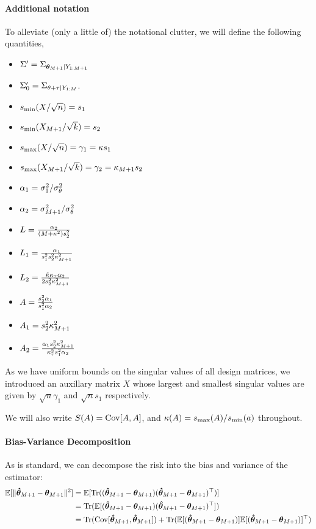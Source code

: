 \paragraph{Additional notation} To alleviate (only a little of) the notational clutter, we will define the following quantities,
\begin{itemize}
\item ${\Sigma'} = \Sigma_{\bm{\theta}_{M+1} \vert Y_{1:M+1}}$
\item ${\Sigma'_{0}} = \Sigma_{\theta + \tau \vert Y_{1:M}}$.
\item ${s_{\min}}(X_{} / \sqrt{{n}}) = s_1$
\item ${s_{\min}}(X_{M+1} / \sqrt{{k}}) = s_2$
\item ${s_{\max}}(X_{} / \sqrt{{n}}) = \gamma_1 = \kappa s_1$
\item ${s_{\max}}(X_{M+1} / \sqrt{{k}}) = \gamma_2 = \kappa_{M+1} s_2$
\item $\alpha_1 = {\sigma_1^2} / {\sigma_\theta^2}$
\item $\alpha_2 = {\sigma_{M+1}^2} / {\sigma_\theta^2}$
\item $L = \frac{\alpha_2}{(M + \kappa^2)s_2^2}$
\item $L_1 = \frac{\alpha_1}{s_1^2s_2^2 \kappa_{M+1}^2}$
\item $L_2 = \frac{\tilde{\kappa} \kappa_\tau \alpha_2}{2s_2^2 \kappa_{M+1}^2}$
\item $A = \frac{s_2^2 \alpha_1}{s_1^2 \alpha_2}$
\item $A_1 = s_2^2 \kappa_{M+1}^2$
\item $A_2 = \frac{\alpha_1 s_2^2 \kappa_{M+1}^2}{\kappa_\tau^2 s_1^2 \alpha_2}$
\end{itemize}

As we have uniform bounds on the singular values of all design matrices, we introduced an auxillary matrix $X$ whose largest and smallest singular values are given by $\sqrt{n}\gamma_1$ and $\sqrt{n}s_1$ respectively.

\noindent We will also write $S(A) = \mathop{\mathrm{Cov}}[A, A]$, and $\kappa(A) = {s_{\max}}(A) / {s_{\min}}(a)$ throughout.

\paragraph{Bias-Variance Decomposition}

As is standard, we can decompose the risk into the bias and variance of the estimator:
\begin{align}
\mathbb{E}[\lVert  \bm{\hat{\theta}}_{M+1} - \bm{\theta}_{M+1}  \rVert^2]  
&= \mathbb{E}[\mathrm{Tr}( (\bm{\hat{\theta}}_{M+1} - \bm{\theta}_{M+1}) (\bm{\hat{\theta}}_{M+1} - \bm{\theta}_{M+1})^\top)] \\
&= \mathrm{Tr}( \mathbb{E} [(\bm{\hat{\theta}}_{M+1} - \bm{\theta}_{M+1}) (\bm{\hat{\theta}}_{M+1} - \bm{\theta}_{M+1})^\top] ) \\
&= \mathrm{Tr}( \mathop{\mathrm{Cov}} [\bm{\hat{\theta}}_{M+1}, \bm{\hat{\theta}}_{M+1}]) + 
\mathrm{Tr}( \mathbb{E}[(\bm{\hat{\theta}}_{M+1} - \bm{\theta}_{M+1})] \mathbb{E}[(\bm{\hat{\theta}}_{M+1} - \bm{\theta}_{M+1})]^\top )
\end{align}

